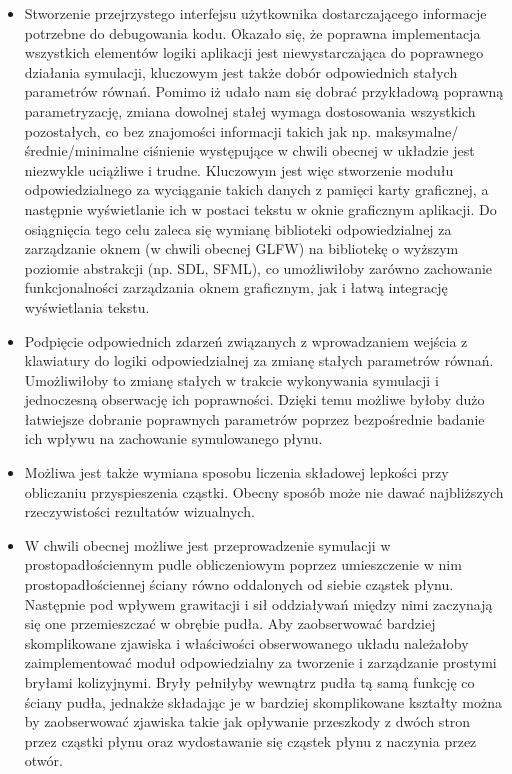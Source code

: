 \documentclass[polish, 12pt]{aghthesis}
\begin{document}
		\begin{itemize}
		
			\item Stworzenie przejrzystego interfejsu użytkownika dostarczającego informacje potrzebne do debugowania kodu. Okazało się, że poprawna implementacja wszystkich elementów logiki aplikacji jest niewystarczająca do poprawnego działania symulacji, kluczowym jest także dobór odpowiednich stałych parametrów równań. Pomimo iż udało nam się dobrać przykładową poprawną parametryzację, zmiana dowolnej stałej wymaga dostosowania wszystkich pozostałych, co bez znajomości informacji takich jak np. maksymalne/średnie/minimalne ciśnienie występujące w chwili obecnej w układzie jest niezwykle uciążliwe i trudne. Kluczowym jest więc stworzenie modułu odpowiedzialnego za wyciąganie takich danych z pamięci karty graficznej, a następnie wyświetlanie ich w postaci tekstu w oknie graficznym aplikacji. Do osiągnięcia tego celu zaleca się wymianę biblioteki odpowiedzialnej za zarządzanie oknem (w chwili obecnej GLFW) na bibliotekę o wyższym poziomie abstrakcji (np. SDL, SFML), co umożliwiłoby zarówno zachowanie funkcjonalności zarządzania oknem graficznym, jak i łatwą integrację wyświetlania tekstu.
			
			\item Podpięcie odpowiednich zdarzeń związanych z wprowadzaniem wejścia z klawiatury do logiki odpowiedzialnej za zmianę stałych parametrów równań. Umożliwiłoby to zmianę stałych w trakcie wykonywania symulacji i jednoczesną obserwację ich poprawności. Dzięki temu możliwe byłoby dużo łatwiejsze dobranie poprawnych parametrów poprzez bezpośrednie badanie ich wpływu na zachowanie symulowanego płynu.
			
			\item Możliwa jest także wymiana sposobu liczenia składowej lepkości przy obliczaniu przyspieszenia cząstki. Obecny sposób może nie dawać najbliższych rzeczywistości rezultatów wizualnych.
			
			\item W chwili obecnej możliwe jest przeprowadzenie symulacji w prostopadłościennym pudle obliczeniowym poprzez umieszczenie w nim prostopadłościennej ściany równo oddalonych od siebie cząstek płynu. Następnie pod wpływem grawitacji i sił oddziaływań między nimi zaczynają się one przemieszczać w obrębie pudła. Aby zaobserwować bardziej skomplikowane zjawiska i właściwości obserwowanego układu należałoby zaimplementować moduł odpowiedzialny za tworzenie i zarządzanie prostymi bryłami kolizyjnymi. Bryły pełniłyby wewnątrz pudła tą samą funkcję co ściany pudła, jednakże składając je w bardziej skomplikowane kształty można by zaobserwować zjawiska takie jak opływanie przeszkody z dwóch stron przez cząstki płynu oraz wydostawanie się cząstek płynu z naczynia przez otwór.
			

\end{itemize}
\end{document}
